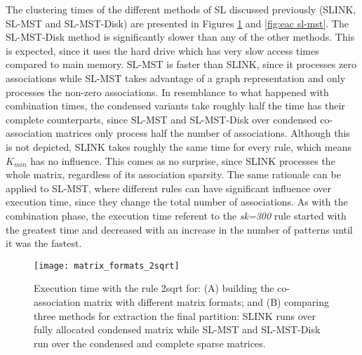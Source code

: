 
The clustering times of the different methods of SL discussed previously (SLINK, SL-MST and SL-MST-Disk) are presented in Figures \ref{fig:eac sl} and \ref{fig:eac sl-mst}.
The SL-MST-Disk method is significantly slower than any of the other methods.
This is expected, since it uses the hard drive which has very slow access times compared to main memory.
SL-MST is faster than SLINK, since it processes zero associations while SL-MST takes advantage of a graph representation and only processes the non-zero associations.
In resemblance to what happened with combination times, the condensed variants take roughly half the time has their complete counterparts, since SL-MST and SL-MST-Disk over condensed co-association matrices only process half the number of associations.
Although this is not depicted, SLINK takes roughly the same time for every rule, which means $K_{min}$ has no influence.
This comes as no surprise, since SLINK processes the whole matrix, regardless of its association sparsity.
The same rationale can be applied to SL-MST, where different rules can have significant influence over execution time, since they change the total number of associations.
As with the combination phase, the execution time referent to the \emph{sk=300} rule started with the greatest time and decreased with an increase in the number of patterns until it was the fastest.


\begin{figure}[hbt!]
    \centering
    \texttt{[image: matrix\_formats\_2sqrt]}
    \caption{Execution time with the rule 2sqrt for: (A) building the co-association matrix with different matrix formats; and (B) comparing three methods for extraction the final partition: SLINK runs over fully allocated condensed matrix while SL-MST and SL-MST-Disk run over the condensed and complete sparse matrices.}
    \label{fig:eac sl}
\end{figure}

